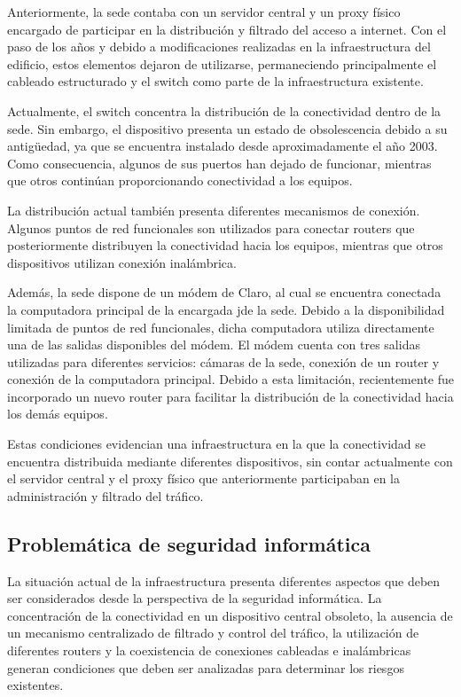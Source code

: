 Anteriormente, la sede contaba con un servidor central y un proxy físico encargado de participar en la distribución y filtrado del acceso a internet. Con el paso de los años y debido a modificaciones realizadas en la infraestructura del edificio, estos elementos dejaron de utilizarse, permaneciendo principalmente el cableado estructurado y el switch como parte de la infraestructura existente.

Actualmente, el switch concentra la distribución de la conectividad dentro de la sede. Sin embargo, el dispositivo presenta un estado de obsolescencia debido a su antigüedad, ya que se encuentra instalado desde aproximadamente el año 2003. Como consecuencia, algunos de sus puertos han dejado de funcionar, mientras que otros continúan proporcionando conectividad a los equipos.

La distribución actual también presenta diferentes mecanismos de conexión. Algunos puntos de red funcionales son utilizados para conectar routers que posteriormente distribuyen la conectividad hacia los equipos, mientras que otros dispositivos utilizan conexión inalámbrica.

Además, la sede dispone de un módem de Claro, al cual se encuentra conectada la computadora principal de la encargada jde la sede. Debido a la disponibilidad limitada de puntos de red funcionales, dicha computadora utiliza directamente una de las salidas disponibles del módem. El módem cuenta con tres salidas utilizadas para diferentes servicios: cámaras de la sede, conexión de un router y conexión de la computadora principal. Debido a esta limitación, recientemente fue incorporado un nuevo router para facilitar la distribución de la conectividad hacia los demás equipos.

Estas condiciones evidencian una infraestructura en la que la conectividad se encuentra distribuida mediante diferentes dispositivos, sin contar actualmente con el servidor central y el proxy físico que anteriormente participaban en la administración y filtrado del tráfico.

\subsection{Problemática de seguridad informática}

La situación actual de la infraestructura presenta diferentes aspectos que deben ser considerados desde la perspectiva de la seguridad informática. La concentración de la conectividad en un dispositivo central obsoleto, la ausencia de un mecanismo centralizado de filtrado y control del tráfico, la utilización de diferentes routers y la coexistencia de conexiones cableadas e inalámbricas generan condiciones que deben ser analizadas para determinar los riesgos existentes.

